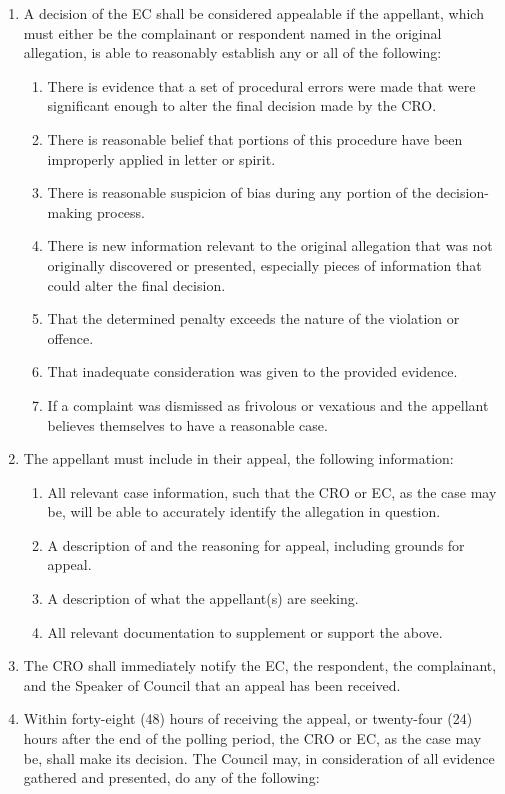 \begin{enumerate}
\begin{enumerate}
\begin{enumerate}
				\end{enumerate}
			\item A decision of the EC shall be considered appealable if the appellant, which must either be the complainant or respondent named in the original allegation, is able to reasonably establish any or all of the following:
				\begin{enumerate}
					\item There is evidence that a set of procedural errors were made that were significant enough to alter the final decision made by the CRO.
					\item There is reasonable belief that portions of this procedure have been improperly applied in letter or spirit.
					\item There is reasonable suspicion of bias during any portion of the decision-making process.
					\item There is new information relevant to the original allegation that was not originally discovered or presented, especially pieces of information that could alter the final decision.
					\item That the determined penalty exceeds the nature of the violation or offence.
					\item That inadequate consideration was given to the provided evidence.
					\item If a complaint was dismissed as frivolous or vexatious and the appellant believes themselves to have a reasonable case.
				\end{enumerate}
			\item The appellant must include in their appeal, the following information:
				\begin{enumerate}
					\item All relevant case information, such that the CRO or EC, as the case may be, will be able to accurately identify the allegation in question.
					\item A description of and the reasoning for appeal, including grounds for appeal.
					\item A description of what the appellant(s) are seeking.
					\item All relevant documentation to supplement or support the above.
				\end{enumerate}
			\item The CRO shall immediately notify the EC, the respondent, the complainant, and the Speaker of Council that an appeal has been received.
			\item Within forty-eight (48) hours of receiving the appeal, or twenty-four (24) hours after the end of the polling period, the CRO or EC, as the case may be, shall make its decision. The Council may, in consideration of all evidence gathered and presented, do any of the following:

\end{enumerate}
\end{enumerate}
